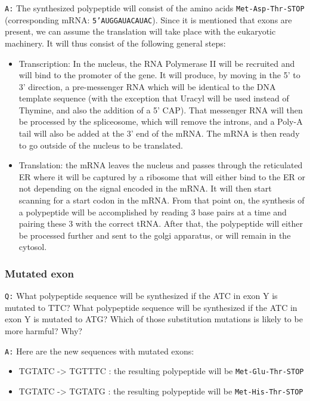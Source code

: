 \documentclass[11pt, a4paper,titlepage]{article}
\begin{document}
\texttt{A:} The synthesized polypeptide will consist of the amino acids
\texttt{Met-Asp-Thr-STOP} (corresponding mRNA: \texttt{5'AUGGAUACAUAC}). Since it is
mentioned that exons are present, we can assume the translation will
take place with the eukaryotic machinery. It will thus consist of the
following general steps:

\begin{itemize}
\item Transcription: In the nucleus, the RNA Polymerase II will be
  recruited and will bind to the promoter of the gene. It will
  produce, by moving in the 5' to 3' direction, a pre-messenger RNA
  which will be identical to the DNA template sequence (with the
  exception that Uracyl will be used instead of Thymine, and also the
  addition of a 5' CAP). That messenger RNA will then be processed by
  the spliceosome, which will remove the introns, and a Poly-A tail
  will also be added at the 3' end of the mRNA. The mRNA is then
  ready to go outside of the nucleus to be translated.
\item Translation: the mRNA leaves the nucleus and passes through the
  reticulated ER where it will be captured by a ribosome that will
  either bind to the ER or not depending on the signal encoded in the
  mRNA. It will then start scanning for a start codon in the
  mRNA. From that point on, the synthesis of a polypeptide will be
  accomplished by reading 3 base pairs at a time and pairing these 3
  with the correct tRNA. After that, the polypeptide will either be
  processed further and sent to the golgi apparatus, or will remain in
  the cytosol.
\end{itemize}
\subsubsection{Mutated exon}
\label{sec-1-2-3}

\texttt{Q:} What polypeptide sequence will be synthesized if the ATC in exon
Y is mutated to TTC? What polypeptide sequence will be synthesized if
the ATC in exon Y is mutated to ATG? Which of those substitution
mutations is likely to be more harmful? Why?

\texttt{A:} Here are the new sequences with mutated exons:

\begin{itemize}
\item TGTATC -> TGTTTC : the resulting polypeptide will be \texttt{Met-Glu-Thr-STOP}
\item TGTATC -> TGTATG : the resulting polypeptide will be \texttt{Met-His-Thr-STOP}
\end{itemize}
\end{document}

